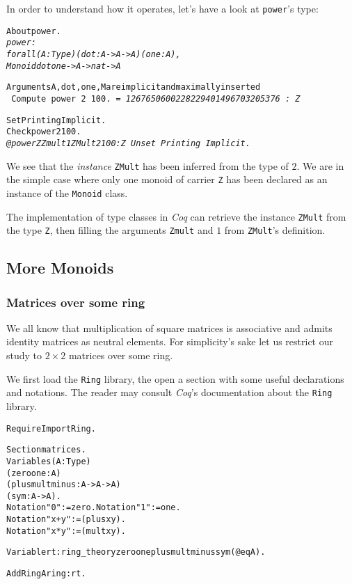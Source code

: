\documentclass[a4]{report}
\newcommand{\coq}{\mbox{\emph{Coq}}}
\begin{document}
In order to understand how it operates, let's have a look at \texttt{power}'s type:
  \begin{alltt}
About power.\it\color{answercolor}
power :
forall (A : Type) (dot : A -> A -> A) (one : A),
Monoid dot one -> A -> nat -> A

Arguments A, dot, one, M are implicit and maximally inserted
\tt\color{black}
Compute power 2 100.\it\color{answercolor}
 = 1267650600228229401496703205376 : Z\tt\color{black}

Set Printing Implicit.
Check power 2 100.\it\color{answercolor}
@power Z Zmult 1 {\color{blue}ZMult}  2 100 : Z \tt\color{black}
Unset Printing Implicit.
\end{alltt}

We see that the \emph{instance} \texttt{ZMult} has been 
inferred from the type of $2$. We are in the simple case where only one monoid
of carrier \texttt{Z} has been declared as an instance of the \texttt{Monoid} class.

The implementation of type classes in {\coq} can retrieve the instance \texttt{ZMult}
from the type \texttt{Z}, then filling the arguments   \texttt{Zmult} and $1$ from
\texttt{ZMult}'s definition.

       

\subsection{More Monoids}
\subsubsection{Matrices over some ring}\label{matring}
We all know that multiplication of square matrices is associative and admits
identity matrices as neutral elements. For simplicity's sake let us restrict our study
to $2 \times 2$ matrices over some ring.

We first load the \texttt{Ring} library, the open a section with some useful declarations and notations. The reader may consult \coq's documentation about the \texttt{Ring} library.

\begin{alltt}
Require Import Ring.

Section matrices.
 Variables (A:Type)
           (zero one : A) 
           (plus mult minus : A -> A -> A)
           (sym : A -> A).
 Notation "0" := zero.  Notation "1" := one.
 Notation "x + y" := (plus x y).  
 Notation "x * y " := (mult x y).

 Variable rt : ring_theory  zero one plus mult minus sym (@eq A).

 Add Ring Aring : rt.  
\end{alltt}
\end{document}
